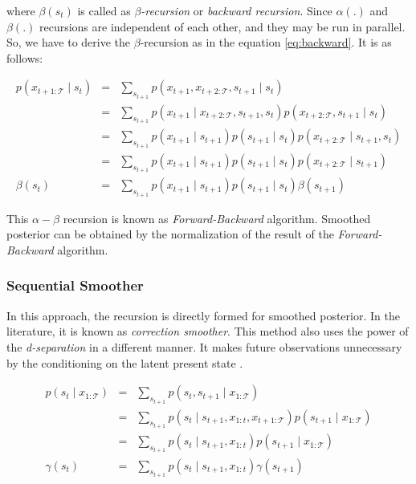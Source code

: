 where $\beta(s_t)$ is called as {\it $\beta$-recursion} or {\it backward recursion}. 
Since $\alpha(.)$ and $\beta(.)$ recursions are independent of each other, and they may be run in parallel. 
So, we have to derive the $\beta$-recursion as in the equation \ref{eq:backward}. It is as follows:

\begin{eqnarray} 
p\left(x_{t+1:\mathcal{T}} \mid s_{t}\right) & = & \sum_{s_{t+1}} p\left(x_{t+1}, x_{t+2:\mathcal{T}}, s_{t+1} \mid s_{t}\right) \\ 
& = & \sum_{s_{t+1}} p\left(x_{t+1} \mid x_{t+2 : \mathcal{T}}, s_{t+1}, s_{t}\right) p\left(x_{t+2:\mathcal{T}}, s_{t+1}\mid s_{t}\right) \\
& = & \sum_{s_{t+1}} p\left(x_{t+1} \mid s_{t+1}\right) p\left(s_{t+1} \mid s_{t}\right) p\left(x_{t+2:\mathcal{T}} \mid s_{t+1} , s_{t}\right) \\
& = & \sum_{s_{t+1}} p\left(x_{t+1} \mid s_{t+1}\right) p\left(s_{t+1} \mid s_{t}\right) p\left(x_{t+2:\mathcal{T}} \mid s_{t+1}\right) \label{eq:backward} \\
\beta(s_t) & = & \sum_{s_{t+1}} p\left(x_{t+1} \mid s_{t+1}\right) p\left(s_{t+1} \mid s_{t}\right) \beta\left(s_{t + 1}\right)
\end{eqnarray}

This $\alpha - \beta$ recursion is known as {\it Forward-Backward} algorithm. Smoothed posterior can be obtained by the normalization of the result of the {\it Forward-Backward} algorithm.

\subsubsection{Sequential Smoother}

In this approach, the recursion is directly formed for smoothed posterior.
In the literature, it is known as {\it correction smoother}. This method also uses the power of the {\it d-separation} in a different manner. 
It makes future observations unnecessary by the conditioning on the latent present state \cite{rauch1965maximum}.

\begin{eqnarray}
    p\left(s_{t} \mid x_{1 : \mathcal{T}}\right) & = & \sum_{s_{t+1}} p\left(s_{t}, s_{t+1} \mid x_{1 : \mathcal{T}}\right) \\
    & = & \sum_{s_{t+1}}p\left(s_{t} \mid s_{t+1} , x_{1 : t}, x_{t+1:\mathcal{T}}\right)p\left(s_{t+1} \mid x_{1:\mathcal{T}}\right) \\
    & = & \sum_{s_{t+1}}p\left(s_{t} \mid s_{t+1} , x_{1 : t}\right)p\left(s_{t+1} \mid x_{1:\mathcal{T}}\right) \label{eq:sequential} \\
    \gamma(s_t) & = & \sum_{s_{t+1}} p\left(s_{t} \mid s_{t+1} , x_{1 : t}\right) \gamma(s_{t+1}) \label{eq:sequential-gamma}
\end{eqnarray}

